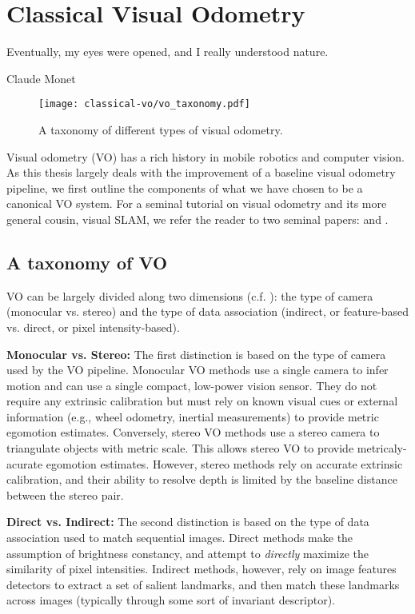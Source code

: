 \chapter{Classical Visual Odometry}
\label{ch:vo}
\epigraph{Eventually, my eyes were opened, and I really understood nature.}{Claude Monet}

\begin{figure}[h!]
\begin{center}
		\texttt{[image: classical-vo/vo\_taxonomy.pdf]}
		\caption{A taxonomy of different types of visual odometry.}
  	\label{fig:vo_taxonomy}
\end{center}
\end{figure}


Visual odometry (VO) has a rich history in mobile robotics and computer vision. As this thesis largely deals with the improvement of a baseline visual odometry pipeline, we first outline the components of what we have chosen to be a canonical VO system. For a seminal tutorial on visual odometry and its more general cousin, visual SLAM, we refer the reader to two seminal papers: \cite{Scaramuzza2011-qr} and \cite{Cadena2016-ds}.

\section{A taxonomy of VO}

VO can be largely divided along two dimensions (c.f. ): the type of camera (monocular vs. stereo) and the type of data association (indirect, or feature-based vs. direct, or pixel intensity-based). 

\textbf{Monocular vs. Stereo:}
The first distinction is based on the type of camera used by the VO pipeline. Monocular VO methods use a single camera to infer motion and can use a single compact, low-power vision sensor. They do not require any extrinsic calibration but must rely on known visual cues or external information (e.g., wheel odometry, inertial measurements) to provide metric egomotion estimates. Conversely, stereo VO methods use a stereo camera to triangulate objects with metric scale. This allows stereo VO to provide metricaly-acurate egomotion estimates. However, stereo methods rely on accurate extrinsic calibration, and their ability to resolve depth is limited by the baseline distance between the stereo pair. 

\textbf{Direct vs. Indirect:}
The second distinction is based on the type of data association used to match sequential images. Direct methods make the assumption of brightness constancy, and attempt to \textit{directly} maximize the similarity of pixel intensities. Indirect methods, however, rely on image features detectors to extract a set of salient landmarks, and then match these landmarks across images (typically through some sort of invariant descriptor).

